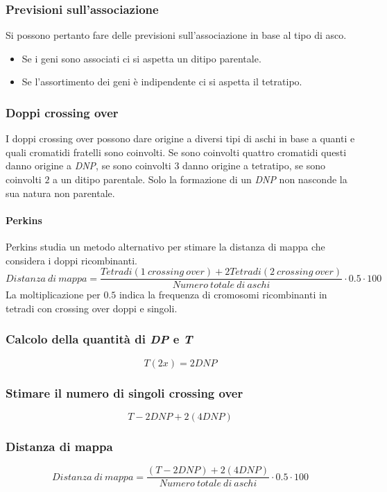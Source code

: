 		\subsubsection{Previsioni sull'associazione}
		Si possono pertanto fare delle previsioni sull'associazione in base al tipo di asco.
		\begin{multicols}{2}
			\begin{itemize}
				\item Se i geni sono associati ci si aspetta un ditipo parentale.
				\item Se l'assortimento dei geni \`e indipendente ci si aspetta il tetratipo.
			\end{itemize}
		\end{multicols}

		\subsubsection{Doppi crossing over}
		I doppi crossing over possono dare origine a diversi tipi di aschi in base a quanti e quali cromatidi fratelli sono coinvolti.
		Se sono coinvolti quattro cromatidi questi danno origine a \emph{DNP}, se sono coinvolti $3$ danno origine a tetratipo, se sono coinvolti $2$ a un ditipo parentale.
		Solo la formazione di un \emph{DNP} non nasconde la sua natura non parentale.

			\paragraph{Perkins}
			Perkins studia un metodo alternativo per stimare la distanza di mappa che considera i doppi ricombinanti.
			\[Distanza\ di\ mappa = \dfrac{Tetradi(1\ crossing\ over) + 2Tetradi(2\ crossing\ over)}{Numero\ totale\ di\ aschi}\cdot 0.5\cdot 100\]
			La moltiplicazione per $0.5$ indica la frequenza di cromosomi ricombinanti in tetradi con crossing over doppi e singoli.

		\subsubsection{Calcolo della quantit\`a di \emph{DP} e \emph{T}}
		\[T(2x) = 2DNP\]
		
		\subsubsection{Stimare il numero di singoli crossing over}
		\[T-2DNP + 2(4DNP)\]

		\subsubsection{Distanza di mappa}
		\[Distanza\ di\ mappa = \dfrac{(T-2DNP)+2(4DNP)}{Numero\ totale\ di\ aschi}\cdot 0.5\cdot 100\]

